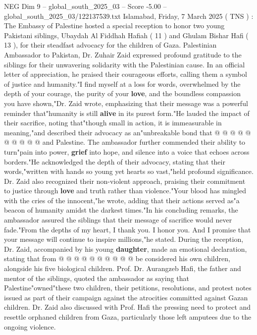 \begin{textsample}{NEG Dim 9 – global\_south\_2025\_03 – Score -5.00 – global\_south\_2025\_03/122137539.txt}  \label{ex:f9_neg_391}
Islamabad, Friday, 7 March 2025 ( TNS ) : The Embassy of Palestine hosted a special reception to honor two young Pakistani siblings, Ubaydah Al Fiddhah Hafiah ( 11 ) and Ghulam Bishar Hafi ( 13 ), for their steadfast advocacy for the children of Gaza.
Palestinian Ambassador to Pakistan, Dr.
Zuhair Zaid expressed profound gratitude to the siblings for their unwavering solidarity with the Palestinian cause.
In an official letter of appreciation, he praised their courageous efforts, calling them a symbol of justice and humanity."I find myself at a loss for words, overwhelmed by the depth of your courage, the purity of your \textbf{love}, and the boundless compassion you have shown,"Dr.
Zaid wrote, emphasizing that their message was a powerful reminder that"humanity is still \textbf{alive} in its purest form."He lauded the impact of their sacrifice, noting that"though small in action, it is immeasurable in meaning,"and described their advocacy as an"unbreakable bond that @ @ @ @ @ @ @ @ @ @ and Palestine.
The ambassador further commended their ability to turn"pain into power, \textbf{grief} into hope, and silence into a voice that echoes across borders."He acknowledged the depth of their advocacy, stating that their words,"written with hands so young yet hearts so vast,"held profound significance.
Dr.
Zaid also recognized their non-violent approach, praising their commitment to justice through \textbf{love} and truth rather than violence."Your blood has mingled with the cries of the innocent,"he wrote, adding that their actions served as"a beacon of humanity amidst the darkest times."In his concluding remarks, the ambassador assured the siblings that their message of sacrifice would never fade."From the depths of my heart, I thank you.
I honor you.
And I promise that your message will continue to inspire millions,"he stated.
During the reception, Dr.
Zaid, accompanied by his young \textbf{daughter}, made an emotional declaration, stating that from @ @ @ @ @ @ @ @ @ @ be considered his own children, alongside his five biological children.
Prof.
Dr.
Aurangzeb Hafi, the father and mentor of the siblings, quoted the ambassador as saying that Palestine"owned"these two children, their petitions, resolutions, and protest notes issued as part of their campaign against the atrocities committed against Gazan children.
Dr.
Zaid also discussed with Prof.
Hafi the pressing need to protect and resettle orphaned children from Gaza, particularly those left amputees due to the ongoing violence.

\end{textsample}
